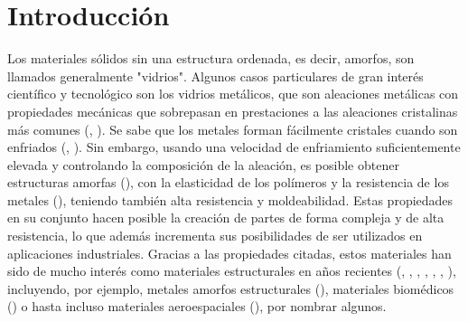 \section{Introducción}
Los materiales sólidos sin una estructura ordenada, es decir, amorfos, son llamados generalmente "vidrios". Algunos casos particulares de gran interés científico y tecnológico son los vidrios metálicos, que son aleaciones metálicas con propiedades mecánicas que sobrepasan en prestaciones a las aleaciones cristalinas más comunes (\cite{luborsky83}, \cite{greer95}). Se sabe que los metales forman fácilmente cristales cuando son enfriados (\cite{callister95}, \cite{smith96}). Sin embargo, usando una velocidad de enfriamiento suficientemente elevada y controlando la composición de la aleación, es posible obtener estructuras amorfas (\cite{liebermann93}), con la elasticidad de los polímeros y la resistencia de los metales (\cite{telford04}), teniendo también alta resistencia y moldeabilidad. Estas propiedades en su conjunto hacen posible la creación de partes de forma compleja y de alta resistencia, lo que además incrementa sus posibilidades de ser utilizados en aplicaciones industriales. Gracias a las propiedades citadas, estos materiales han sido de mucho interés como materiales estructurales en años recientes (\cite{chen74}, \cite{lowhaphandu99}, \cite{inoue00}, \cite{wang04}, \cite{ashby06}, \cite{zhang07}, \cite{schuh07}), incluyendo, por ejemplo, metales amorfos estructurales (\cite{lu04}), materiales biomédicos (\cite{zberg09}) o hasta incluso materiales aeroespaciales (\cite{peker93}), por nombrar algunos.


